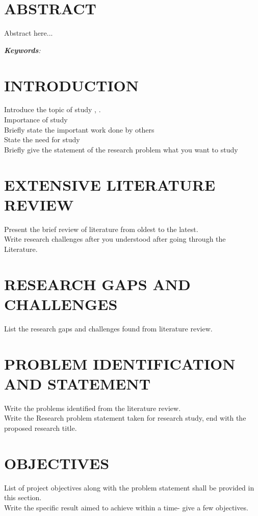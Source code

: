 \pagebreak
\section*{ABSTRACT}

Abstract here...


	
\textit{\textbf{Keywords}:}

\section{INTRODUCTION}




Introduce the topic of study \cite{Jain2019}, \cite{Chmiel2019}.\\
Importance of study\\
Briefly state the important work done by others\\
State the need for study\\
Briefly give the statement of the research problem what you want to study\\



\section{EXTENSIVE LITERATURE REVIEW }
Present the brief review of literature from oldest to the latest.\\
Write research challenges after you understood after going through the Literature.\\

\section{RESEARCH GAPS AND CHALLENGES}
List the research gaps and challenges found from literature review.


\section{PROBLEM IDENTIFICATION AND STATEMENT}
Write the problems identified from the literature review.\\
Write the Research problem statement taken for research study, end with the proposed research title.


\section{OBJECTIVES}
List of project objectives along with the problem statement shall be provided in this section.\\
Write the specific result aimed to achieve within a time- give a few objectives.\\


